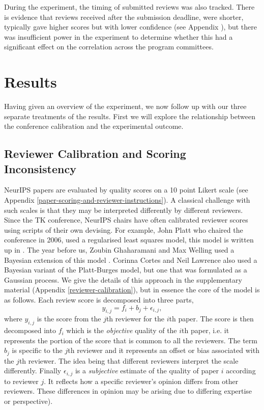 \documentclass[twoside]{article}
\begin{document}
During the experiment, the timing of submitted reviews was also tracked. There is evidence that reviews received after the submission deadline, were shorter, typically gave higher scores but with lower confidence (see Appendix \label{effect-of-late-reviews}), but there was insufficient power in the experiment to determine whether this had a significant effect on the correlation across the program committees. 

\section{Results}

Having given an overview of the experiment, we now follow up with our
three separate treatments of the results. First we will explore the
relationship between the conference calibration and the experimental
outcome.

\hypertarget{reviewer-calibration-and-scoring-inconsistency}{%
\subsection{Reviewer Calibration and Scoring Inconsistency}\label{reviewer-calibration-and-scoring-inconsistency}}

NeurIPS papers are evaluated by quality scores on a 10 point Likert
scale (see Appendix \ref{paper-scoring-and-reviewer-instructions}). A
classical challenge with such scales is that they may be interpreted
differently by different reviewers. Since the TK conference, NeurIPS
chairs have often calibrated reviewer scores using scripts of their
own devising. For example, John Platt who chaired the conference in
2006, used a regularised least squares model, this model is written up
in \cite{Platt-calibration12}. The year before us, Zoubin Ghaharamani
and Max Welling used a Bayesian extension of this model
\cite{Ge-bayesian15}. Corinna Cortes and Neil Lawrence also used a
Bayesian variant of the Platt-Burges model, but one that was
formulated as a Gaussian process. We give the details of this approach
in the supplementary material (Appendix \ref{reviewer-calibration}),
but in essence the core of the model is as follows. Each review score
is decomposed into three parts,
$$
y_{i,j} = f_i + b_j + \epsilon_{i, j},
$$
where $y_{i,j}$ is the score from the $j$th reviewer for the $i$th
paper. The score is then decomposed into $f_i$ which is the
\emph{objective} quality of the $i$th paper, i.e. it represents the
portion of the score that is common to all the reviewers. The term
$b_j$ is specific to the $j$th reviewer and it represents an offset or
bias associated with the $j$th reviewer. The idea being that different
reviewers interpret the scale differently. Finally $\epsilon_{i,j}$ is
a \emph{subjective} estimate of the quality of paper $i$ according to
reviewer $j$. It reflects how a specific reviewer's opinion differs
from other reviewers. These differences in opinion may be arising due
to differing expertise or perspective).
\end{document}
